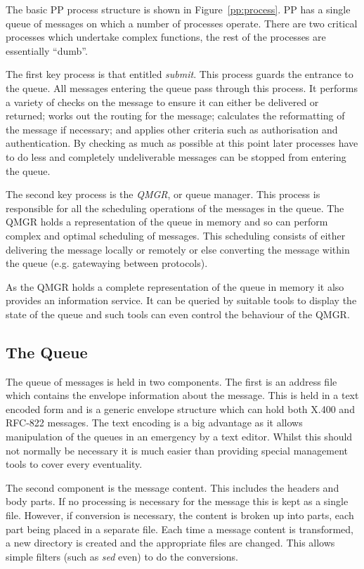 The basic PP process structure is shown in Figure~\ref{pp:process}. PP
has a single queue of messages on which a number of processes operate.
There are two critical processes which undertake complex functions,
the rest of the processes are essentially ``dumb''.


The first key process is that entitled {\em submit}. This process
guards the entrance to the queue. All messages entering the queue pass
through this process. It performs a variety of checks on the message
to ensure it can either be delivered or returned; works out the
routing for the message; calculates the reformatting of the message if
necessary; and applies other criteria such as authorisation and
authentication. By checking as much as possible at this point later processes
have to do less and completely undeliverable messages can be stopped
from entering the queue.

The second key process is the {\em QMGR}, or queue manager. This
process is responsible for all the scheduling operations of the
messages in the queue. The QMGR holds a representation of the queue in
memory and so can perform complex and optimal scheduling of messages.
This scheduling consists of either delivering the message locally or
remotely or else converting the message within the queue (e.g.
gatewaying between protocols).

As the QMGR holds a complete representation of the queue in memory it
also provides an information service. It can be queried by suitable
tools to display the state of the queue and such tools can even
control the behaviour of the QMGR.

\subsection{The Queue}

The queue of messages is held in two components. The first is an
address file which contains the envelope information about the
message. This is held in a text encoded form and is a generic envelope
structure which can hold both X.400 and RFC-822 messages. The text
encoding is a big advantage as it allows manipulation of the queues in
an emergency by a text editor. Whilst this should not normally be
necessary it is much easier than providing special management tools
to cover every eventuality.

The second component is the message content. This includes the headers
and body parts. If no processing is necessary for the message this is
kept as a single file. However, if conversion is necessary, the
content is broken up into parts, each part being placed in a separate
file. Each time a message content is transformed, a new directory is
created and the appropriate files are changed. This allows simple
filters (such as {\em sed} even) to do the conversions.


